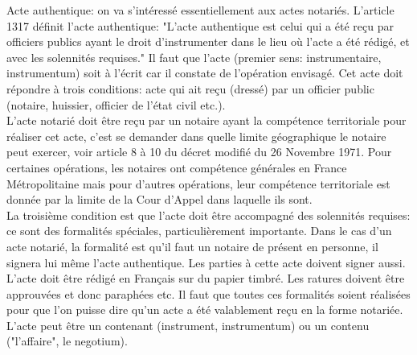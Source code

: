 Acte authentique: on va s'intéressé essentiellement aux actes notariés. L'article 1317 définit l'acte authentique: "L'acte authentique est celui qui a été reçu par officiers publics ayant le droit d'instrumenter dans le lieu où l'acte a été rédigé, et avec les solennités requises." Il faut que l'acte (premier sens: instrumentaire, instrumentum) soit à l'écrit car il constate de l'opération envisagé. Cet acte doit répondre à trois conditions: acte qui ait reçu (dressé) par un officier public (notaire, huissier, officier de l'état civil etc.). \\ 
L'acte notarié doit être reçu par un notaire ayant la compétence territoriale pour réaliser cet acte, c'est se demander dans quelle limite géographique le notaire peut exercer, voir article 8 à 10 du décret modifié du 26 Novembre 1971. Pour certaines opérations, les notaires ont compétence générales en France Métropolitaine mais pour d'autres opérations, leur compétence territoriale est donnée par la limite de la Cour d'Appel dans laquelle ils sont. \\
La troisième condition est que l'acte doit être accompagné des solennités requises: ce sont des formalités spéciales, particulièrement importante. Dans le cas d'un acte notarié, la formalité est qu'il faut un notaire de présent en personne, il signera lui même l'acte authentique. Les parties à cette acte doivent signer aussi. L'acte doit être rédigé en Français sur du papier timbré. Les ratures doivent être approuvées et donc paraphées etc. Il faut que toutes ces formalités soient réalisées pour que l'on puisse dire qu'un acte a été valablement reçu en la forme notariée. \\
L'acte peut être un contenant (instrument, instrumentum) ou un contenu ("l'affaire", le negotium). 


